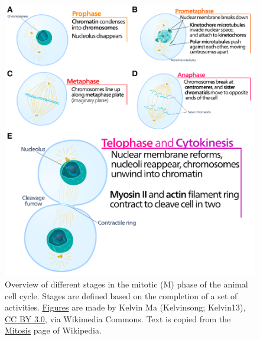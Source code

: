 \begin{figure}[p]
    \centering
    \includegraphics[width=\linewidth]{figures/cell-cycle-mitosis.pdf}
    \caption[Stages of mitotic phase of the cell cycle]{%
        Overview of different stages in the mitotic (M) phase of the animal cell cycle.
        Stages are defined based on the completion of a set of activities.
        \href{https://commons.wikimedia.org/wiki/File:Animal_cell_cycle-en.svg}{Figures} are made by Kelvin Ma (Kelvinsong; Kelvin13), \href{https://creativecommons.org/licenses/by/3.0}{CC BY 3.0}, via Wikimedia Commons.
        Text is copied from the \href{https://en.wikipedia.org/wiki/Mitosis}{Mitosis} page of Wikipedia.
        \legendcontdnote
    }
    \label{fig:cell-cycle-mitosis}
\end{figure}
